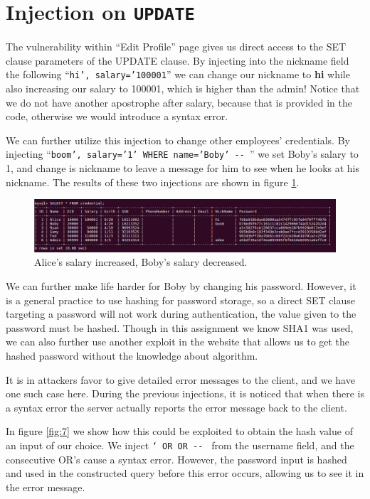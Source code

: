 \documentclass[12pt,reqno]{amsart}
\newcommand{\code}[1]{\texttt{#1}}
\begin{document}
\newpage
\section{Injection on \code{UPDATE}}
The vulnerability within ``Edit Profile'' page gives us direct access to the SET clause parameters of the UPDATE clause. By injecting into the nickname field the following ``\code{hi', salary='100001}'' we can change our nickname to \textbf{hi} while also increasing our salary to 100001, which is higher than the admin! Notice that we do not have another apostrophe after salary, because that is provided in the code, otherwise we would introduce a syntax error.

We can further utilize this injection to change other employees' credentials. By injecting ``\code{boom', salary='1' WHERE name='Boby' -{}- }'' we set Boby's salary to 1, and change is nickname to leave a message for him to see when he looks at his nickname. The results of these two injections are shown in figure \ref{fig:6}.

\begin{figure}[h]
  \includegraphics[width=\linewidth]{img/SQL_UPDATE_1-2.png}
  \caption{Alice's salary increased, Boby's salary decreased.}
  \label{fig:6}
\end{figure}

We can further make life harder for Boby by changing his password. However, it is a general practice to use hashing for password storage, so a direct SET clause targeting a password will not work during authentication, the value given to the password must be hashed. Though in this assignment we know SHA1 was used, we can also further use another exploit in the website that allows us to get the hashed password without the knowledge about algorithm.

It is in attackers favor to give detailed error messages to the client, and we have one such case here. During the previous injections, it is noticed that when there is a syntax error the server actually reports the error message back to the client. 

In figure \ref{fig:7} we show how this could be exploited to obtain the hash value of an input of our choice. We inject \code{` OR OR -{}- } from the username field, and the consecutive OR's cause a syntax error. However, the password input is hashed and used in the constructed query before this error occurs, allowing us to see it in the error message.
\end{document}
